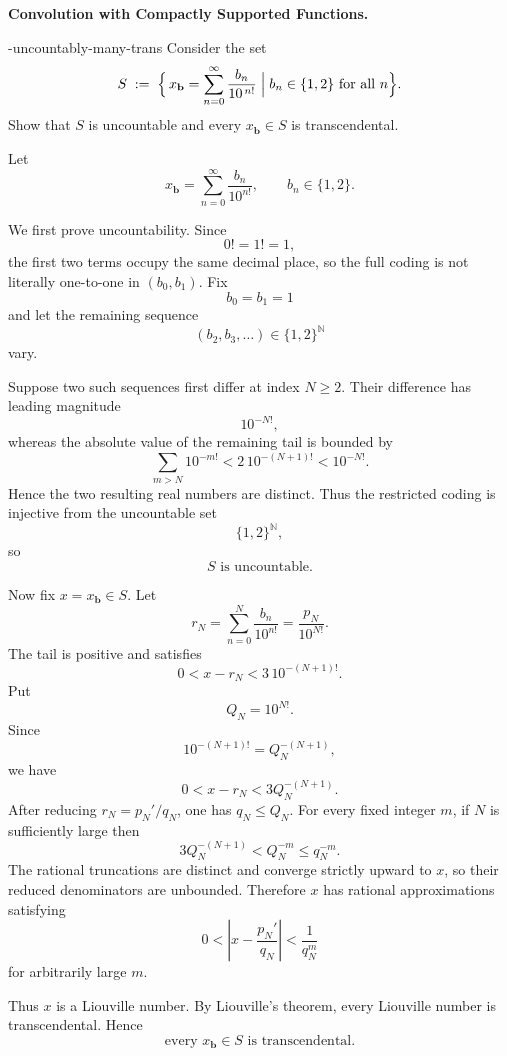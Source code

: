 \begin{problem}[CP-II-0210]
\label{prob:cp-ii-0210}
\textbf{Convolution with Compactly Supported Functions.}

\hspace*{1.5em}{Uncountably many transcendental numbers via factorial-base decimals}-{uncountably-many-trans}
	Consider the set
	\[
	S\;:=\;\Bigl\{\,x_{\mathbf b}=\sum_{n=0}^{\infty}\frac{b_n}{10^{\,n!}} \;\Big|\; b_n\in\{1,2\}\ \text{for all }n\Bigr\}.
	\]
	Show that $S$ is uncountable and every $x_{\mathbf b}\in S$ is transcendental.
\end{problem}

\begin{solution}
Let
\[
x_{\mathbf b}
=
\sum_{n=0}^{\infty}\frac{b_n}{10^{n!}},
\qquad
b_n\in\{1,2\}.
\]

We first prove uncountability. Since
\[
0!=1!=1,
\]
the first two terms occupy the same decimal place, so the full coding is not literally
one-to-one in \((b_0,b_1)\). Fix
\[
b_0=b_1=1
\]
and let the remaining sequence
\[
(b_2,b_3,\ldots)\in\{1,2\}^{\mathbb N}
\]
vary.

Suppose two such sequences first differ at index \(N\ge2\). Their difference has leading
magnitude
\[
10^{-N!},
\]
whereas the absolute value of the remaining tail is bounded by
\[
\sum_{m>N}10^{-m!}
<
2\,10^{-(N+1)!}
<
10^{-N!}.
\]
Hence the two resulting real numbers are distinct. Thus the restricted coding is injective
from the uncountable set
\[
\{1,2\}^{\mathbb N},
\]
so
\[
\boxed{S\text{ is uncountable}.}
\]

Now fix \(x=x_{\mathbf b}\in S\). Let
\[
r_N
=
\sum_{n=0}^{N}\frac{b_n}{10^{n!}}
=
\frac{p_N}{10^{N!}}.
\]
The tail is positive and satisfies
\[
0<x-r_N
<
3\,10^{-(N+1)!}.
\]
Put
\[
Q_N=10^{N!}.
\]
Since
\[
10^{-(N+1)!}
=
Q_N^{-(N+1)},
\]
we have
\[
0<x-r_N
<
3Q_N^{-(N+1)}.
\]
After reducing \(r_N=p_N'/q_N\), one has \(q_N\le Q_N\). For every fixed integer
\(m\), if \(N\) is sufficiently large then
\[
3Q_N^{-(N+1)}
<
Q_N^{-m}
\le
q_N^{-m}.
\]
The rational truncations are distinct and converge strictly upward to \(x\), so their reduced
denominators are unbounded. Therefore \(x\) has rational approximations satisfying
\[
0<
\left|x-\frac{p_N'}{q_N}\right|
<
\frac1{q_N^m}
\]
for arbitrarily large \(m\).

Thus \(x\) is a Liouville number. By Liouville's theorem, every Liouville number is
transcendental. Hence
\[
\boxed{
\text{every }x_{\mathbf b}\in S\text{ is transcendental}.
}
\]
\end{solution}


